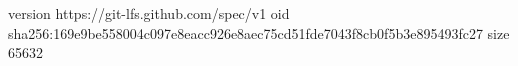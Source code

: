 version https://git-lfs.github.com/spec/v1
oid sha256:169e9be558004c097e8eacc926e8aec75cd51fde7043f8cb0f5b3e895493fc27
size 65632

